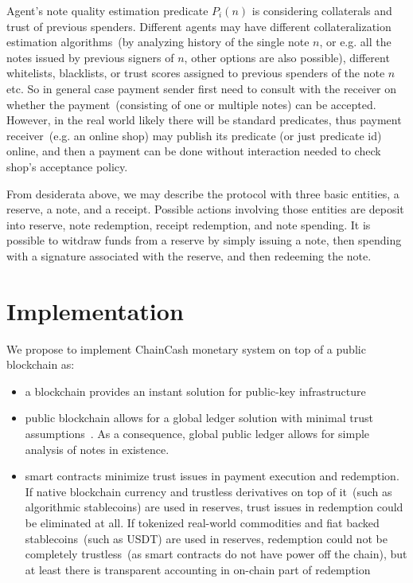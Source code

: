 \documentclass{llncs}   %
\newcommand{\cc}{ChainCash}
\begin{document}
Agent's note quality estimation predicate $P_i(n)$ is considering collaterals and trust of previous spenders. Different agents may have different 
collateralization estimation algorithms~(by analyzing history of the single note $n$, or e.g. all the notes issued by previous signers of $n$, other options are also possible), different whitelists, blacklists, or trust scores assigned to previous spenders of the note $n$ etc. So in general case payment sender first need to consult with the receiver on whether the payment~(consisting of one or multiple notes) can be accepted. However, in the real world likely there will be standard predicates, thus payment receiver~(e.g. an online shop) may publish its predicate (or just predicate id) online, and then a payment can be done without interaction needed to check shop's acceptance policy.

From desiderata above, we may describe the protocol with three basic entities, a reserve, a note, and a receipt. Possible actions involving those entities are deposit into reserve, note redemption,
 receipt redemption, and note spending. It is possible to witdraw funds from a reserve by simply issuing a note, then spending with a signature
associated with the reserve, and then redeeming the note.

\section{Implementation}
\label{sec-impl}

We propose to implement \cc{} monetary system on top of a public blockchain as:

\begin{itemize}
  \item{} a blockchain provides an instant solution for public-key infrastructure
  \item{} public blockchain allows for a global ledger solution with minimal trust assumptions~\cite{kya}. As a consequence, global public ledger allows for simple analysis of notes in existence.
  \item{} smart contracts minimize trust issues in payment execution and redemption. If native blockchain currency and trustless derivatives on top of it~(such as algorithmic stablecoins) are used in reserves, trust issues in redemption could be eliminated at all. If tokenized real-world commodities and fiat backed stablecoins~(such as USDT) are used in reserves, redemption could not be completely trustless~(as smart contracts do not have power off the chain), but at least there is transparent accounting in on-chain part of redemption
\end{itemize}
\end{document}

